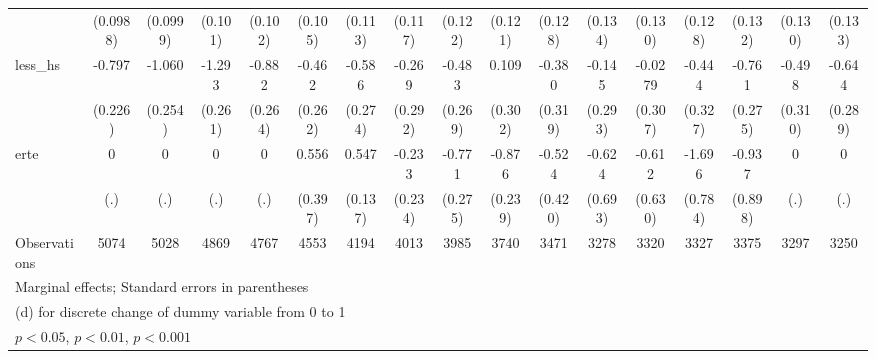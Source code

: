 {\begin{tabular}{l*{16}{c}}
                    &    (0.0988)         &    (0.0999)         &     (0.101)         &     (0.102)         &     (0.105)         &     (0.113)         &     (0.117)         &     (0.122)         &     (0.121)         &     (0.128)         &     (0.134)         &     (0.130)         &     (0.128)         &     (0.132)         &     (0.130)         &     (0.133)         \\
[1em]
less\_hs             &      -0.797\sym{***}&      -1.060\sym{***}&      -1.293\sym{***}&      -0.882\sym{***}&      -0.462         &      -0.586\sym{*}  &      -0.269         &      -0.483         &       0.109         &      -0.380         &      -0.145         &     -0.0279         &      -0.444         &      -0.761\sym{**} &      -0.498         &      -0.644\sym{*}  \\
                    &     (0.226)         &     (0.254)         &     (0.261)         &     (0.264)         &     (0.262)         &     (0.274)         &     (0.292)         &     (0.269)         &     (0.302)         &     (0.319)         &     (0.293)         &     (0.307)         &     (0.327)         &     (0.275)         &     (0.310)         &     (0.289)         \\
[1em]
erte                &           0         &           0         &           0         &           0         &       0.556         &       0.547\sym{***}&      -0.233         &      -0.771\sym{**} &      -0.876\sym{***}&      -0.524         &      -0.624         &      -0.612         &      -1.696\sym{*}  &      -0.937         &           0         &           0         \\
                    &         (.)         &         (.)         &         (.)         &         (.)         &     (0.397)         &     (0.137)         &     (0.234)         &     (0.275)         &     (0.239)         &     (0.420)         &     (0.693)         &     (0.630)         &     (0.784)         &     (0.898)         &         (.)         &         (.)         \\
\hline
Observations        &        5074         &        5028         &        4869         &        4767         &        4553         &        4194         &        4013         &        3985         &        3740         &        3471         &        3278         &        3320         &        3327         &        3375         &        3297         &        3250         \\
\hline\hline
\multicolumn{17}{l}{\footnotesize Marginal effects; Standard errors in parentheses}\\
\multicolumn{17}{l}{\footnotesize  (d) for discrete change of dummy variable from 0 to 1}\\
\multicolumn{17}{l}{\footnotesize \sym{*} \(p<0.05\), \sym{**} \(p<0.01\), \sym{***} \(p<0.001\)}\\
\end{tabular}
}
